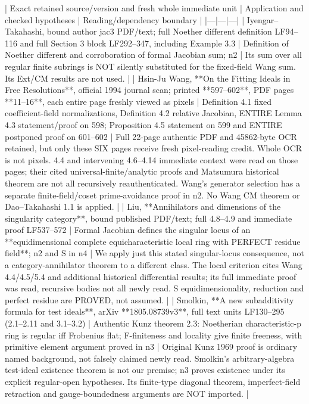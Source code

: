 \documentclass[11pt]{article}
\begin{document}
| Exact retained source/version and fresh whole immediate unit | Application and checked hypotheses | Reading/dependency boundary |
|---|---|---|
| Iyengar--Takahashi, bound author jac3 PDF/text; full Noether different definition LF94--116 and full Section 3 block LF292--347, including Example 3.3 | Definition of Noether different and corroboration of formal Jacobian sum; n2 | Its sum over all regular finite subrings is NOT silently substituted for the fixed-field Wang sum. Its Ext/CM results are not used. |
| Hsin-Ju Wang, **On the Fitting Ideals in Free Resolutions**, official 1994 journal scan; printed **597--602**, PDF pages **11--16**, each entire page freshly viewed as pixels | Definition 4.1 fixed coefficient-field normalizations, Definition 4.2 relative Jacobian, ENTIRE Lemma 4.3 statement/proof on 598; Proposition 4.5 statement on 599 and ENTIRE postponed proof on 601--602 | Full 22-page authentic PDF and 45862-byte OCR retained, but only these SIX pages receive fresh pixel-reading credit. Whole OCR is not pixels. 4.4 and intervening 4.6--4.14 immediate context were read on those pages; their cited universal-finite/analytic proofs and Matsumura historical theorem are not all recursively reauthenticated. Wang's generator selection has a separate finite-field/coset prime-avoidance proof in n2. No Wang CM theorem or Dao--Takahashi 1.1 is applied. |
| Liu, **Annihilators and dimensions of the singularity category**, bound published PDF/text; full 4.8--4.9 and immediate proof LF537--572 | Formal Jacobian defines the singular locus of an **equidimensional complete equicharacteristic local ring with PERFECT residue field**; n2 and S in n4 | We apply just this stated singular-locus consequence, not a category-annihilator theorem to a different class. The local criterion cites Wang 4.4/4.5/5.4 and additional historical differential results; its full immediate proof was read, recursive bodies not all newly read. S equidimensionality, reduction and perfect residue are PROVED, not assumed. |
| Smolkin, **A new subadditivity formula for test ideals**, arXiv **1805.08739v3**, full text units LF130--295 (2.1--2.11 and 3.1--3.2) | Authentic Kunz theorem 2.3: Noetherian characteristic-p ring is regular iff Frobenius flat; F-finiteness and locality give finite freeness, with primitive element argument proved in n3 | Original Kunz 1969 proof is ordinary named background, not falsely claimed newly read. Smolkin's arbitrary-algebra test-ideal existence theorem is not our premise; n3 proves existence under its explicit regular-open hypotheses. Its finite-type diagonal theorem, imperfect-field retraction and gauge-boundedness arguments are NOT imported. |
\end{document}
